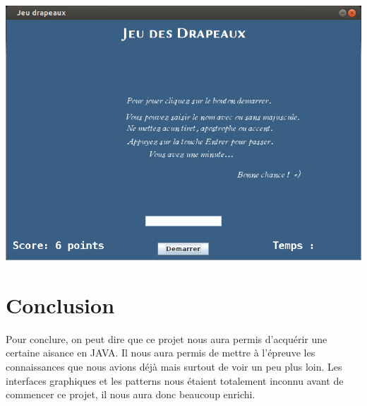 \documentclass{article}
\begin{document}
\begin{center}
\includegraphics[scale=0.5]{capture6.png}
\end{center}

\newpage
\section*{Conclusion}
Pour conclure, on peut dire que ce projet nous aura permis d'acquérir une certaine aisance en JAVA. Il nous aura permis de mettre à l'épreuve les connaissances que nous avions déjà mais surtout de voir un peu plus loin. Les interfaces graphiques et les patterns nous étaient totalement inconnu avant de commencer ce projet, il nous aura donc beaucoup enrichi.
\end{document}

